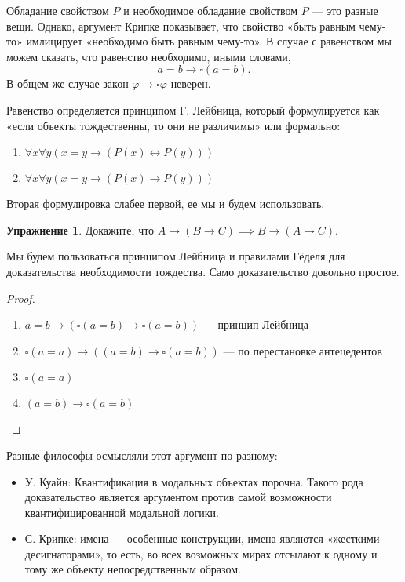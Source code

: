 \documentclass[openany]{book}
\theoremstyle{plain}
\theoremstyle{definition}
\newtheorem{xrc}{Упражнение}[]
\begin{document}
Обладание свойством \(P\) и необходимое обладание свойством \(P\) — это разные вещи. Однако, аргумент Крипке показывает, что свойство «быть равным чему-то» имлицирует «необходимо быть равным чему-то». В случае с равенством мы можем сказать, что равенство необходимо, иными словами, $$a = b \to \square(a = b).$$ В общем же случае закон \(\varphi \to \square \varphi\) неверен.

Равенство определяется принципом Г. Лейбница, который формулируется как «если объекты тождественны, то они не различимы» или формально:
\begin{enumerate}
    \item \(\forall x \forall y (x = y \to (P(x) \leftrightarrow P(y)))\)
    \item \(\forall x \forall y (x = y \to (P(x) \to P(y)))\)
\end{enumerate}

Вторая формулировка слабее первой, ее мы и будем использовать.

\begin{xrc} 
    Докажите, что \(A \to (B \to C) \implies B \to (A \to C)\). 
\end{xrc}

Мы будем пользоваться принципом Лейбница и правилами Гёделя для доказательства необходимости тождества. Само доказательство довольно простое.

\begin{proof}
    \begin{enumerate}
	\item \(a = b \to (\square(a = b) \to \square(a = b))\) --- принцип Лейбница
	\item \(\square(a = a) \to ((a = b) \to \square(a = b))\) --- по перестановке антецедентов
	\item \(\square(a = a)\)
	\item \((a = b) \to \square(a = b)\)
    \end{enumerate}
\end{proof}

Разные философы осмысляли этот аргумент по-разному:
\begin{itemize}
    \item У. Куайн: Квантификация в модальных объектах порочна. Такого рода доказательство является аргументом против самой возможности квантифицированной модальной логики. 
    \item С. Крипке: имена — особенные конструкции, имена являются «жесткими десигнаторами», то есть, во всех возможных мирах отсылают к одному и тому же объекту непосредственным образом.
\end{itemize}
\end{document}
